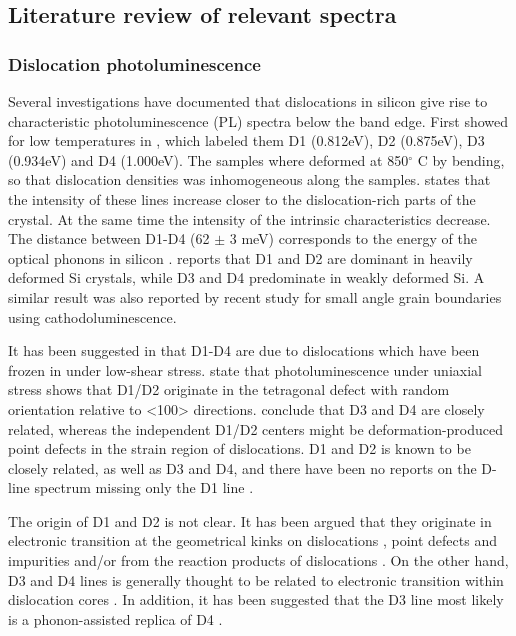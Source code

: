 \subsection{Literature review of relevant spectra}

\subsubsection{Dislocation photoluminescence}

Several investigations have documented that dislocations in silicon give rise to characteristic photoluminescence (PL) spectra below the band edge. First showed for low temperatures in \cite{drozdov76}, which labeled them D1 (0.812eV), D2 (0.875eV), D3 (0.934eV) and D4 (1.000eV). The samples where deformed at 850$^\circ$ C by bending, so that dislocation densities was inhomogeneous along the samples. \cite{drozdov76} states that the intensity of these lines increase closer to the dislocation-rich parts of the crystal. At the same time the intensity of the intrinsic characteristics decrease. The distance between D1-D4 (62 $\pm$ 3 meV) corresponds to the energy of the optical phonons in silicon \cite{drozdov76}. \cite{drozdov76} reports that D1 and D2 are dominant in heavily deformed Si crystals, while D3 and D4 predominate in weakly deformed Si. A similar result was also reported by recent study \cite{lee09} for small angle grain boundaries using cathodoluminescence.

It has been suggested in \cite{sauer85} that D1-D4 are due to dislocations which have been frozen in under low-shear stress. \cite{sauer85} state that photoluminescence under uniaxial stress shows that D1/D2 originate in the tetragonal defect with random orientation relative to <100> directions. \cite{sauer85} conclude that D3 and D4 are closely related, whereas the independent D1/D2 centers might be deformation-produced point defects in the strain region of dislocations. D1 and D2 is known to be closely related, as well as D3 and D4, and there have been no reports on the D-line spectrum missing only the D1 line \cite{sugimoto06}.

The origin of D1 and D2 is not clear. It has been argued that they originate in electronic transition at the geometrical kinks on dislocations \cite{suezawa83}, point defects \cite{sauer85} and impurities \cite{higgs91} and/or from the reaction products of dislocations \cite{sekiguchi95}. On the other hand, D3 and D4 lines is generally thought to be related to electronic transition within dislocation cores \cite{kveder95}. In addition, it has been suggested that the D3 line most likely is a phonon-assisted replica of D4 \cite{kveder95}.

